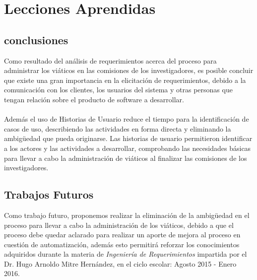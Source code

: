 \documentclass{report}
\begin{document}
\chapter{Lecciones Aprendidas}
    
    \section{conclusiones}
    Como resultado del análisis de requerimientos acerca del proceso para administrar los viáticos en las comisiones de los investigadores, es posible concluir que existe una gran importancia en la elicitación de requerimientos, debido a la comunicación con los clientes, los usuarios del sistema y otras personas que tengan relación sobre el producto de software a desarrollar.\\\\
Además el uso de Historias de Usuario reduce el tiempo para la identificación de casos de uso, describiendo las actividades en forma directa y eliminando la ambigüedad que pueda originarse. Las historias de usuario permitieron identificar a los actores y las actividades a desarrollar, comprobando las necesidades básicas para llevar a cabo la administración de viáticos al finalizar las comisiones de los investigadores.
    
    \section{Trabajos Futuros}
    Como trabajo futuro, proponemos realizar la eliminación de la ambigüedad en el proceso para llevar a cabo la administración de los viáticos, debido a que el proceso debe quedar aclarado para realizar un aporte de mejora al proceso en cuestión de automatización, además esto permitirá reforzar los conocimientos adquiridos durante la materia de \emph{Ingeniería de Requerimientos} impartida por el Dr. Hugo Arnoldo Mitre Hernández, en el ciclo escolar: Agosto 2015 - Enero 2016.
\end{document}
